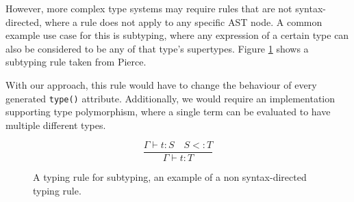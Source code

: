 \documentclass[nofilelist]{cslthse-msc}
\newcommand{\CR}[1]{\textcolor{green!60!black}{[\textbf{CR}:#1]}}
\begin{document}
However, more complex type systems may require rules that are not syntax-directed, where a rule does not apply to any specific AST node.
A common example use case for this is subtyping, where any expression of a certain type can also be considered to be any of that type's supertypes.
Figure \ref{typingruleexamplesub} shows a subtyping rule taken from Pierce\cite{Pierce}.

With our approach, this rule would have to change the behaviour of every generated \lstinline{type()} attribute.
Additionally, we would require an implementation supporting type polymorphism, where a single term can be evaluated to have multiple different types.

\begin{figure}[]
  \begin{equation}
    \tag{T-Sub}
    \frac{
      \Gamma \vdash t : S\quad
      S <: T
    }{
      \Gamma \vdash t : T
    }
  \end{equation}
  \caption{A typing rule for subtyping, an example of a non syntax-directed typing rule.}
  \label{typingruleexamplesub}
\end{figure}



\end{document}
